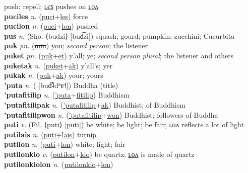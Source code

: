 push; repell; \hyperref[puciles]{ʟєꜱ} pushes on \hyperref[pucilon]{ʟᴏᴧ} \label{puci} \\
\textbf{puciles} \textit{n.} (\hyperref[puci]{puci}+\hyperref[les]{les})
force \label{puciles} \\
\textbf{pucilon} \textit{n.} (\hyperref[puci]{puci}+\hyperref[lon]{lon})
pushed \label{pucilon} \\
\textbf{pus} \textit{n.} (Sho. ⟨budzi⟩ [bud͡zi])
squash; gourd; pumpkin; zucchini; Cucurbita \label{pus} \\
\textbf{puk} \textit{pn.} (\hyperref[min]{\sout{min}})
you; \textit{second person}; the listener \label{puk} \\
\textbf{puket} \textit{pn.} (\hyperref[puk]{puk}+\hyperref[et]{et})
y’all; ye; \textit{second person plural}; the listener and others \label{puket} \\
\textbf{puketak} \textit{n.} (\hyperref[puket]{puket}+\hyperref[ak]{ak})
y’all’s; yer \label{puketak} \\
\textbf{pukak} \textit{n.} (\hyperref[puk]{puk}+\hyperref[ak]{ak})
your; yours \label{pukak} \\
\textbf{'puta} \textit{n.} ( [bud̚˨dʱɐ˦])
Buddha (title) \label{'puta} \\
\textbf{'putafitilip} \textit{n.} (\hyperref['puta]{'puta}+\hyperref[fitilip]{fitilip})
Buddhism \label{'putafitilip} \\
\textbf{'putafitilipak} \textit{n.} (\hyperref['putafitilip]{'putafitilip}+\hyperref[ak]{ak})
Buddhist; of Buddhism \label{'putafitilipak} \\
\textbf{'putafitilipwon} \textit{n.} (\hyperref['putafitilip]{'putafitilip}+\hyperref[won]{won})
Buddhist; followers of Buddha \label{'putafitilipwon} \\
\textbf{puti} \textit{v.} (Fil. ⟨puti⟩ [puti])
be white; be light; be fair; \hyperref[putilon]{ʟᴏᴧ} reflects a lot of light \label{puti} \\
\textbf{putilais} \textit{n.} (\hyperref[puti]{puti}+\hyperref[lais]{lais})
turnip \label{putilais} \\
\textbf{putilon} \textit{n.} (\hyperref[puti]{puti}+\hyperref[lon]{lon})
white; light; fair \label{putilon} \\
\textbf{putilonkio} \textit{v.} (\hyperref[putilon]{putilon}+\hyperref[kio]{kio})
be quartz; \hyperref[putilonkiolon]{ʟᴏᴧ} is made of quartz \label{putilonkio} \\
\textbf{putilonkiolon} \textit{n.} (\hyperref[putilonkio]{putilonkio}+\hyperref[lon]{lon})
